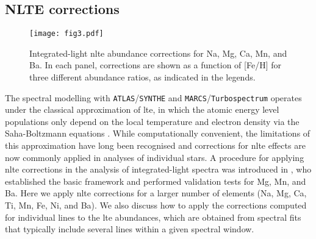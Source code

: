 \documentclass{aa}
\begin{document}
\subsection{NLTE corrections}
\label{sec:nlte}

\begin{figure*}
\centering
\texttt{[image: fig3.pdf]}
\caption{\label{fig:nltecorr}Integrated-light \ac{nlte} abundance corrections for Na, Mg, Ca, Mn, and Ba. In each panel, corrections are shown as a function of [Fe/H] for three different abundance ratios, as indicated in the legends.}
\end{figure*}



The spectral modelling with \texttt{ATLAS}/\texttt{SYNTHE} and \texttt{MARCS}/\texttt{Turbospectrum}  operates under the classical approximation of \ac{lte}, in which the atomic energy level populations only depend on the local temperature and electron density via the Saha-Boltzmann equations  \citep{Mihalas1970}. While computationally convenient, the limitations of this approximation have long been recognised and corrections for \ac{nlte} effects are now commonly applied in analyses of individual stars. A procedure for applying \ac{nlte} corrections in the analysis of integrated-light spectra was introduced in \citet{Eitner2019}, who established the basic framework and performed validation tests for Mg, Mn, and Ba. 
Here we apply \ac{nlte} corrections for a larger number of elements (Na, Mg, Ca, Ti, Mn, Fe, Ni, and Ba). We also discuss how to apply the corrections computed for individual lines to the \ac{lte} abundances, which are obtained from spectral fits that typically include several lines within a given spectral window. 
\end{document}
